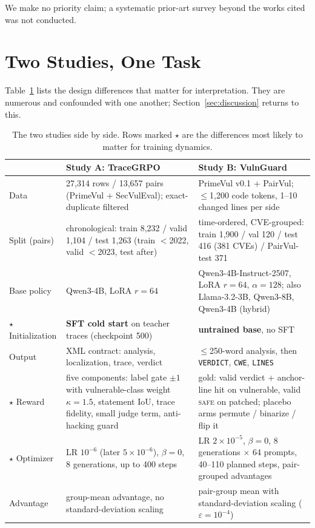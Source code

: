 \documentclass[journal]{IEEEtran}
\newcommand{\safe}{\textsc{safe}}
\begin{document}
We make no priority claim; a systematic prior-art survey beyond the works cited was not conducted.

\section{Two Studies, One Task}
\label{sec:programs}
Table~\ref{tab:programs} lists the design differences that matter for interpretation. They are numerous and confounded with one another; Section~\ref{sec:discussion} returns to this.

\begin{table}[t]
\centering\small
\caption{The two studies side by side. Rows marked $\star$ are the differences most likely to matter for training dynamics.}
\label{tab:programs}
\begin{tabular}{p{2.4cm}p{7.3cm}p{7.3cm}}
\toprule
 & \textbf{Study A: TraceGRPO} & \textbf{Study B: VulnGuard}\\
\midrule
Data & 27,314 rows / 13,657 pairs (PrimeVul + SecVulEval); exact-duplicate filtered & PrimeVul v0.1 + PairVul; $\le$1,200 code tokens, 1--10 changed lines per side\\
Split (pairs) & chronological: train 8,232 / valid 1,104 / test 1,263 (train $<$2022, valid $<$2023, test after) & time-ordered, CVE-grouped: train 1,900 / val 120 / test 416 (381 CVEs) / PairVul-test 371\\
Base policy & Qwen3-4B, LoRA $r{=}64$ & Qwen3-4B-Instruct-2507, LoRA $r{=}64$, $\alpha{=}128$; also Llama-3.2-3B, Qwen3-8B, Qwen3-4B (hybrid)\\
$\star$ Initialization & \textbf{SFT cold start} on teacher traces (checkpoint 500) & \textbf{untrained base}, no SFT\\
Output & XML contract: analysis, localization, trace, verdict & $\le$250-word analysis, then \texttt{VERDICT}, \texttt{CWE}, \texttt{LINES}\\
$\star$ Reward & five components: label gate $\pm1$ with vulnerable-class weight $\kappa{=}1.5$, statement IoU, trace fidelity, small judge term, anti-hacking guard & gold: valid verdict + anchor-line hit on vulnerable, valid \safe{} on patched; placebo arms permute / binarize / flip it\\
$\star$ Optimizer & LR $10^{-6}$ (later $5{\times}10^{-6}$), $\beta{=}0$, 8 generations, up to 400 steps & LR $2{\times}10^{-5}$, $\beta{=}0$, 8 generations $\times$ 64 prompts, 40--110 planned steps, pair-grouped advantages\\
Advantage & group-mean advantage, no standard-deviation scaling & pair-group mean with standard-deviation scaling ($\varepsilon{=}10^{-4}$)\\

\end{tabular}
\end{table}
\end{document}
